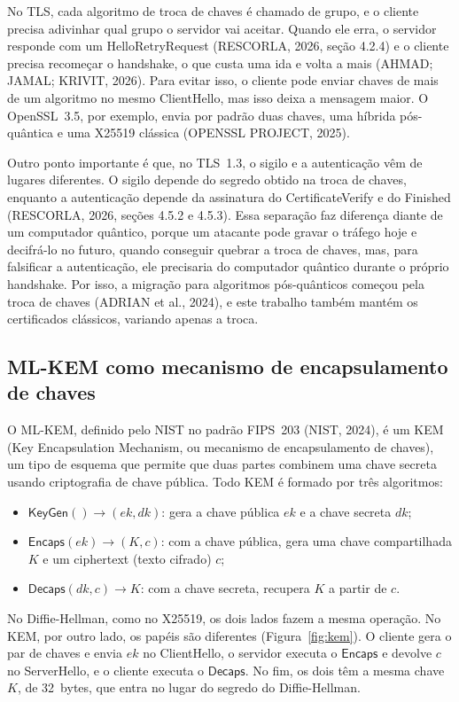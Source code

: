 \documentclass[12pt,a4paper]{article}
\begin{document}
No TLS, cada algoritmo de troca de chaves é chamado de grupo, e o cliente
precisa adivinhar qual grupo o servidor vai aceitar. Quando ele erra, o
servidor responde com um HelloRetryRequest (RESCORLA, 2026, seção 4.2.4) e o cliente
precisa recomeçar o handshake, o que custa uma ida e volta a mais (AHMAD;
JAMAL; KRIVIT, 2026). Para evitar isso, o cliente pode enviar chaves de
mais de um algoritmo no mesmo ClientHello, mas isso deixa a
mensagem maior. O OpenSSL~3.5, por exemplo, envia por padrão duas chaves, uma híbrida pós-quântica e uma X25519 clássica (OPENSSL PROJECT, 2025).

Outro ponto importante é que, no TLS~1.3, o sigilo e a autenticação vêm de
lugares diferentes. O sigilo depende do segredo obtido na troca de chaves,
enquanto a autenticação depende da assinatura do CertificateVerify
e do Finished (RESCORLA, 2026, seções 4.5.2 e 4.5.3). Essa
separação faz diferença diante de um computador quântico, porque um
atacante pode gravar o tráfego hoje e decifrá-lo
no futuro, quando conseguir quebrar a troca de chaves, mas, para falsificar a autenticação, ele precisaria do
computador quântico durante o próprio handshake. Por isso, a migração para
algoritmos pós-quânticos começou pela troca de chaves (ADRIAN et al.,
2024), e este trabalho também mantém os certificados clássicos, variando
apenas a troca.


\subsection{ML-KEM como mecanismo de encapsulamento de chaves}
\label{sec:mlkem}

O ML-KEM, definido pelo NIST no padrão FIPS~203 (NIST, 2024), é um KEM (Key
Encapsulation Mechanism, ou mecanismo de encapsulamento de chaves), um tipo
de esquema que permite que duas partes combinem uma chave secreta usando
criptografia de chave pública. Todo KEM é formado por três algoritmos:
\begin{itemize}
  \item $\mathsf{KeyGen}() \rightarrow (ek, dk)$: gera a chave pública
  $ek$ e a chave secreta $dk$;
  \item $\mathsf{Encaps}(ek) \rightarrow (K, c)$: com a chave pública,
  gera uma chave compartilhada $K$ e um ciphertext (texto cifrado) $c$;
  \item $\mathsf{Decaps}(dk, c) \rightarrow K$: com a chave secreta,
  recupera $K$ a partir de $c$.
\end{itemize}

No Diffie-Hellman, como no X25519, os dois lados fazem a mesma operação.
No KEM, por outro lado, os papéis são diferentes (Figura~\ref{fig:kem}). O
cliente gera o
par de chaves e envia $ek$ no ClientHello, o servidor executa o
$\mathsf{Encaps}$ e devolve $c$ no ServerHello, e o cliente
executa o $\mathsf{Decaps}$. No fim, os dois têm a mesma chave $K$, de
32~bytes, que entra no lugar do segredo do Diffie-Hellman.
\end{document}
